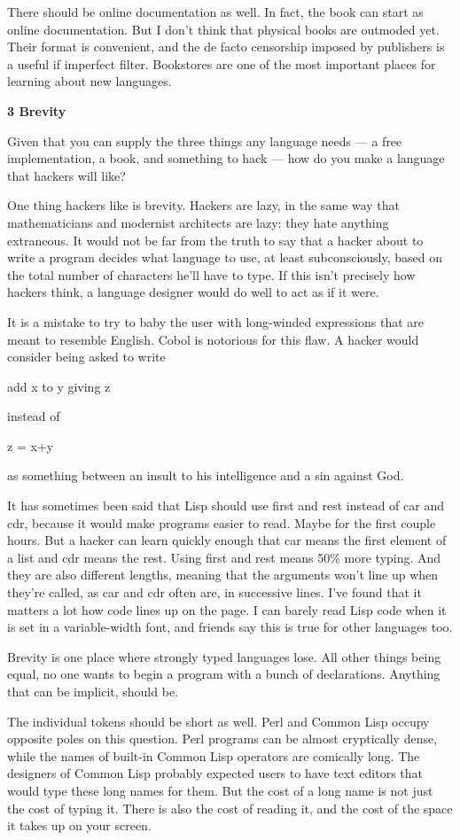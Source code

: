 \documentclass[12pt]{book}
\begin{document}
There should be online documentation as well. In fact, the book can
start as online documentation. But I don't think that physical books are
outmoded yet. Their format is convenient, and the de facto censorship
imposed by publishers is a useful if imperfect filter. Bookstores are
one of the most important places for learning about new languages.

\textbf{3 Brevity}

Given that you can supply the three things any language needs --- a free
implementation, a book, and something to hack --- how do you make a
language that hackers will like?

One thing hackers like is brevity. Hackers are lazy, in the same way
that mathematicians and modernist architects are lazy: they hate
anything extraneous. It would not be far from the truth to say that a
hacker about to write a program decides what language to use, at least
subconsciously, based on the total number of characters he'll have to
type. If this isn't precisely how hackers think, a language designer
would do well to act as if it were.

It is a mistake to try to baby the user with long-winded expressions
that are meant to resemble English. Cobol is notorious for this flaw. A
hacker would consider being asked to write

add x to y giving z

instead of

z = x+y

as something between an insult to his intelligence and a sin against
God.

It has sometimes been said that Lisp should use first and rest instead
of car and cdr, because it would make programs easier to read. Maybe for
the first couple hours. But a hacker can learn quickly enough that car
means the first element of a list and cdr means the rest. Using first
and rest means 50\% more typing. And they are also different lengths,
meaning that the arguments won't line up when they're called, as car and
cdr often are, in successive lines. I've found that it matters a lot how
code lines up on the page. I can barely read Lisp code when it is set in
a variable-width font, and friends say this is true for other languages
too.

Brevity is one place where strongly typed languages lose. All other
things being equal, no one wants to begin a program with a bunch of
declarations. Anything that can be implicit, should be.

The individual tokens should be short as well. Perl and Common Lisp
occupy opposite poles on this question. Perl programs can be almost
cryptically dense, while the names of built-in Common Lisp operators are
comically long. The designers of Common Lisp probably expected users to
have text editors that would type these long names for them. But the
cost of a long name is not just the cost of typing it. There is also the
cost of reading it, and the cost of the space it takes up on your
screen.
\end{document}
